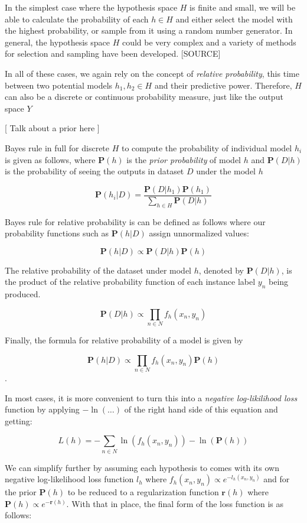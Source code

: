 \documentclass[twoside]{article}
\begin{document}
In the simplest case where the hypothesis space \(H\) is finite and small, we will be able to calculate the probability of each \(h \in H\) and either select the model with the highest probability, or sample from it using a random number generator. In general, the hypothesis space \(H\) could be very complex and a variety of methods for selection and sampling have been developed. [SOURCE]

In all of these cases, we again rely on the concept of \textit{relative probability}, this time between two potential models \(h_1, h_2 \in H\) and their predictive power. Therefore, \(H\) can also be a discrete or continuous probability measure, just like the output space \(Y\)

[ Talk about a prior here ]

Bayes rule in full for discrete \(H\) to compute the probability of individual model \(h_i\) is given as follows, where \(\mathbf{P}(h)\) is the \textit{prior probability} of model \(h\) and \(\mathbf{P}(D|h)\) is the probability of seeing the outputs in dataset \(D\) under the model \(h\)

\[\mathbf{P}(h_i|D)=\frac{\mathbf{P}(D|h_1)\mathbf{P}(h_1)}{\sum_{h \in H}\mathbf{P}(D|h)}\]

Bayes rule for relative probability is can be defined as follows where our probability functions such as \(\mathbf{P}(h|D)\) assign unnormalized values:

\begin{equation}
\label{eq:bayes}
\mathbf{P}(h|D)\propto\mathbf{P}(D|h)\mathbf{P}(h)
\end{equation}

The relative probability of the dataset under model \(h\), denoted by \(\mathbf{P}(D|h)\), is the product of the relative probability function of each instance label \(y_n\) being produced.

\[\mathbf{P}(D|h)\propto \prod_{n \in N} f_h(x_n,y_n)\]

Finally, the formula for relative probability of a model is given by

\[\mathbf{P}(h|D)\propto\prod_{n \in N} f_h(x_n,y_n)\mathbf{P}(h)\].

In most cases, it is more convenient to turn this into a \textit{negative log-likilihood loss} function by applying \(-\ln(\ldots)\) of the right hand side of this equation and getting:

\[L(h)=-\sum_{n \in N} \ln(f_h(x_n,y_n))-\ln(\mathbf{P}(h))\]

We can simplify further by assuming each hypothesis to comes with its own negative log-likelihood loss function \(l_h\) where \(f_h(x_n,y_n)\propto e^{-l_h(x_n,y_n)}\) and for the prior \(\mathbf{P}(h)\) to be reduced to a regularization function \(\mathbf{r}(h)\) where \(\mathbf{P}(h)\propto e^{-\mathbf{r}(h)}\). With that in place, the final form of the loss function is as follows:
\end{document}
